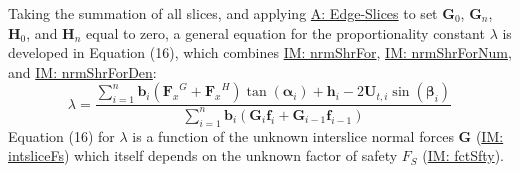 \documentclass[12pt]{article}
\begin{document}
Taking the summation of all slices, and applying \hyperref[assumpES]{A: Edge-Slices} to set ${\mathbf{G}}_{0}$, ${\mathbf{G}}_{n}$, ${\mathbf{H}}_{0}$, and ${\mathbf{H}}_{n}$ equal to zero, a general equation for the proportionality constant $λ$ is developed in Equation (16), which combines \hyperref[IM:nrmShrFor]{IM: nrmShrFor}, \hyperref[IM:nrmShrForNum]{IM: nrmShrForNum}, and \hyperref[IM:nrmShrForDen]{IM: nrmShrForDen}:
\begin{displaymath}
λ=\frac{\displaystyle\sum_{i=1}^{n}{{\mathbf{b}}_{i} \left({{\mathbf{F}_{x}}^{G}}+{{\mathbf{F}_{x}}^{H}}\right) \tan\left({\mathbf{α}}_{i}\right)+{\mathbf{h}}_{i} -2 {\mathbf{U}_{t,i}} \sin\left({\mathbf{β}}_{i}\right)}}{\displaystyle\sum_{i=1}^{n}{{\mathbf{b}}_{i} \left({\mathbf{G}}_{i} {\mathbf{f}}_{i}+{\mathbf{G}}_{i-1} {\mathbf{f}}_{i-1}\right)}}
\end{displaymath}
Equation (16) for $λ$ is a function of the unknown interslice normal forces $\mathbf{G}$ (\hyperref[IM:intsliceFs]{IM: intsliceFs}) which itself depends on the unknown factor of safety ${F_{S}}$ (\hyperref[IM:fctSfty]{IM: fctSfty}).
\par~
\end{document}
